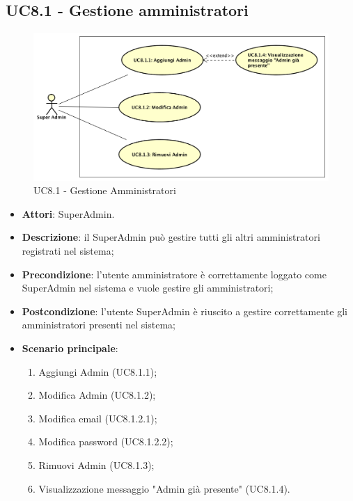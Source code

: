 \documentclass[../AnalisiDeiRequisiti_v4.0.0.tex]{subfiles}
\begin{document}
\subsection{UC8.1 - Gestione amministratori} 
\label{sssec:UC8.1} 
\begin{figure}[!h]
	\centering
	\includegraphics[width=\textwidth]{UseCases/UC8_GestionePannelloSuperadmin/UC8_1_GestioneAmministratori/UC8_1_GestioneAmministratori.png}
	\caption{UC8.1 - Gestione Amministratori}
\end{figure}
\begin{itemize} 
\item \textbf{Attori}: SuperAdmin.
\item \textbf{Descrizione}: il SuperAdmin può gestire tutti gli altri amministratori registrati nel sistema;
\item \textbf{Precondizione}: l'utente amministratore è correttamente loggato come SuperAdmin nel sistema e vuole gestire gli amministratori;
\item \textbf{Postcondizione}: l'utente SuperAdmin è riuscito a gestire correttamente gli amministratori presenti nel sistema;
\item \textbf{Scenario principale}: \begin{enumerate}\item Aggiungi Admin (UC8.1.1);\item Modifica Admin (UC8.1.2);\item Modifica email (UC8.1.2.1);\item Modifica password (UC8.1.2.2);\item Rimuovi Admin (UC8.1.3);\item Visualizzazione messaggio "Admin già presente" (UC8.1.4). 
 \end{enumerate}
\end{itemize} 
\end{document}
